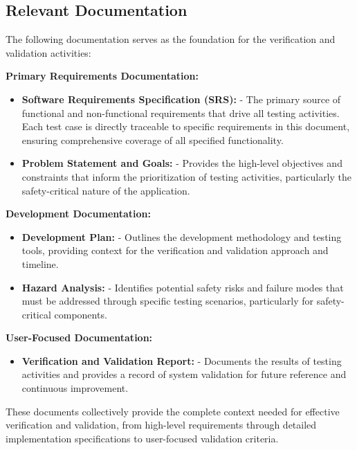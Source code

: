 \documentclass[12pt, titlepage]{article}
\begin{document}
\subsection{Relevant Documentation}

The following documentation serves as the foundation for the verification and
validation activities:

\textbf{Primary Requirements Documentation:}
\begin{itemize}
    \item \textbf{Software Requirements Specification (SRS):} \cite{SRS} - The
    primary source of functional and non-functional requirements that drive all
    testing activities. Each test case is directly traceable to specific
    requirements in this document, ensuring comprehensive coverage of all
    specified functionality.
    
    \item \textbf{Problem Statement and Goals:} \cite{ProblemStatement} -
    Provides the high-level objectives and constraints that inform the
    prioritization of testing activities, particularly the safety-critical
    nature of the application.
\end{itemize}

\textbf{Development Documentation:}
\begin{itemize}
    \item \textbf{Development Plan:} \cite{DevelopmentPlan} - Outlines the
    development methodology and testing tools, providing context for the
    verification and validation approach and timeline.
    
    \item \textbf{Hazard Analysis:} \cite{HazardAnalysis} - Identifies potential
    safety risks and failure modes that must be addressed through specific
    testing scenarios, particularly for safety-critical components.
\end{itemize}

\textbf{User-Focused Documentation:}
\begin{itemize}
    \item \textbf{Verification and Validation Report:} \cite{VnVReport} -
    Documents the results of testing activities and provides a record of system
    validation for future reference and continuous improvement.
\end{itemize}

These documents collectively provide the complete context needed for effective
verification and validation, from high-level requirements through detailed
implementation specifications to user-focused validation criteria.
\end{document}
